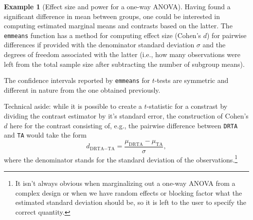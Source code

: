 \documentclass[
  11pt,
  letterpaper,
]{scrbook}
\theoremstyle{definition}
\newtheorem{example}{Example}[chapter]
\theoremstyle{definition}
\theoremstyle{remark}
\begin{document}
\begin{example}[Effect size and power for a one-way
ANOVA]
Having found a significant difference in mean between groups, one could
be interested in computing estimated marginal means and contrasts based
on the latter. The \texttt{emmeans} function has a method for computing
effect size (Cohen's \(d\)) for pairwise differences if provided with
the denominator standard deviation \(\sigma\) and the degrees of freedom
associated with the latter (i.e., how many observations were left from
the total sample size after subtracting the number of subgroup means).

The confidence intervals reported by \texttt{emmeans} for \(t\)-tests
are symmetric and different in nature from the one obtained previously.

Technical aside: while it is possible to create a \(t\)-statistic for a
constrast by dividing the contrast estimator by it's standard error, the
construction of Cohen's \(d\) here for the contrast consisting of, e.g.,
the pairwise difference between \texttt{DRTA} and \texttt{TA} would take
the form \[
d_{\text{DRTA}- \text{TA}} = \frac{\mu_{\text{DRTA}}- \mu_{\text{TA}}}{\sigma},
\] where the denominator stands for the standard deviation of the
observations.\footnote{It isn't always obvious when marginalizing out a
  one-way ANOVA from a complex design or when we have random effects or
  blocking factor what the estimated standard deviation should be, so it
  is left to the user to specify the correct quantity.}

\end{example}
\end{document}
